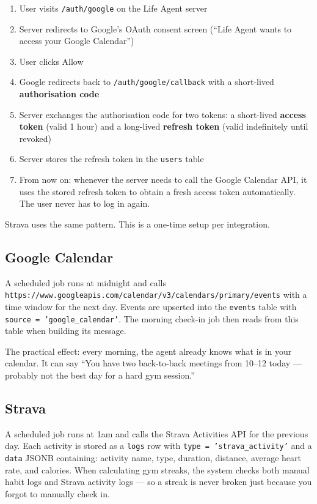 \documentclass[12pt, a4paper]{article}
\begin{document}
\begin{enumerate}
    \item User visits \texttt{/auth/google} on the Life Agent server
    \item Server redirects to Google's OAuth consent screen (``Life Agent wants to access your Google Calendar'')
    \item User clicks Allow
    \item Google redirects back to \texttt{/auth/google/callback} with a short-lived \textbf{authorisation code}
    \item Server exchanges the authorisation code for two tokens: a short-lived \textbf{access token} (valid 1 hour) and a long-lived \textbf{refresh token} (valid indefinitely until revoked)
    \item Server stores the refresh token in the \texttt{users} table
    \item From now on: whenever the server needs to call the Google Calendar API, it uses the stored refresh token to obtain a fresh access token automatically. The user never has to log in again.
\end{enumerate}

Strava uses the same pattern. This is a one-time setup per integration.

\subsection{Google Calendar}

A scheduled job runs at midnight and calls \texttt{https://www.googleapis.com/calendar/v3/calendars/primary/events} with a time window for the next day. Events are upserted into the \texttt{events} table with \texttt{source = 'google\_calendar'}. The morning check-in job then reads from this table when building its message.

The practical effect: every morning, the agent already knows what is in your calendar. It can say ``You have two back-to-back meetings from 10--12 today --- probably not the best day for a hard gym session.''

\subsection{Strava}

A scheduled job runs at 1am and calls the Strava Activities API for the previous day. Each activity is stored as a \texttt{logs} row with \texttt{type = 'strava\_activity'} and a \texttt{data} JSONB containing: activity name, type, duration, distance, average heart rate, and calories. When calculating gym streaks, the system checks both manual habit logs and Strava activity logs --- so a streak is never broken just because you forgot to manually check in.
\end{document}
